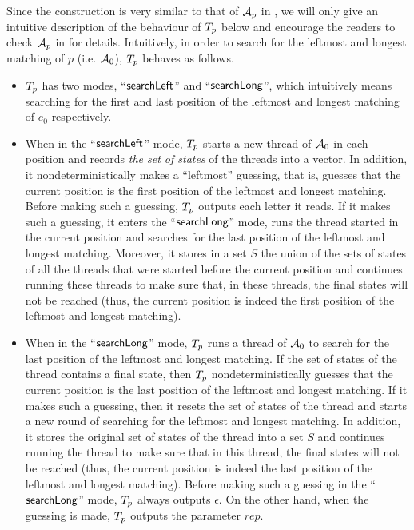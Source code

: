 %
Since the construction is very similar to that of $\mathcal{A}_p$ in \cite{CCHLW18}, we will only give an intuitive description of the behaviour of $T_p$ below and encourage the readers to check $\mathcal{A}_p$ in \cite{CCHLW18} for details.
Intuitively, in order to search for the leftmost and longest matching of $p$ (i.e. $\mathcal{A}_0$), $T_{p}$ behaves as follows.
\begin{itemize}
\item $T_{p}$ has two modes, ``$\mathsf{searchLeft}$'' and ``$\mathsf{searchLong}$'', which intuitively means searching  for the first and last position of the leftmost and longest matching of $e_0$ respectively.
\item When in the ``$\mathsf{searchLeft}$'' mode, $T_{p}$ starts a new thread of $\mathcal{A}_0$ in each position and records \emph{the set of states} of the threads into a vector.
    In addition, it nondeterministically makes a ``leftmost'' guessing, that is, guesses that the current position is the first position of the leftmost and longest matching. Before making such a guessing, $T_{p}$ outputs each letter it reads.
    If it makes such a guessing, it enters the ``$\mathsf{searchLong}$'' mode, runs the thread started in the current position and searches for the last position of the leftmost and longest matching.
    Moreover, it stores in a set $S$ the union of the sets of states of all the threads that were started before the current position and continues running these threads to make sure that, in these threads, the final states will not be reached (thus, the current position is indeed the first position of the leftmost and longest matching).
\item When in the ``$\mathsf{searchLong}$'' mode, $T_p$ runs a thread of $\mathcal{A}_{0}$ to search for the last position of the leftmost and longest matching.
    If the set of states of the thread contains a final state, then $T_p$ nondeterministically guesses that the current position is the last position of the leftmost and longest matching.
    If it makes such a guessing, then it resets the set of states of the thread and starts a new round of searching for the leftmost and longest matching.
    In addition, it stores the original set of states of the thread into a set $S$ and continues running the thread to make sure that in this thread, the final states  will not be reached (thus, the current position is indeed the last position of the leftmost and longest matching). Before making such a guessing in the ``$\mathsf{searchLong}$'' mode, $T_p$ always outputs $\epsilon$. On the other hand, when the guessing is made, $T_p$ outputs the parameter $rep$. 

\end{itemize}
